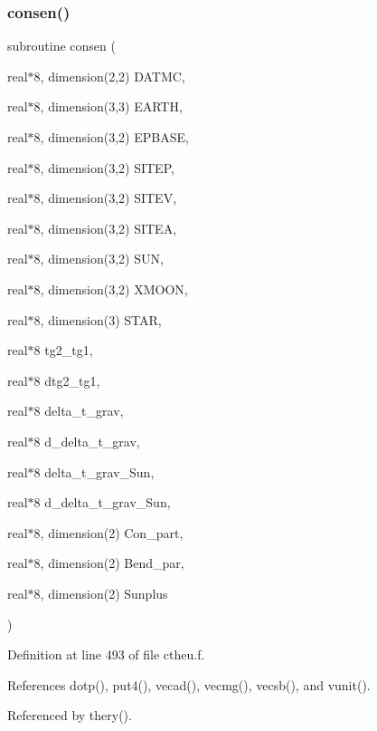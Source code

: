 \subsubsection{\texorpdfstring{consen()}{consen()}}
{\footnotesize\ttfamily subroutine consen (\begin{DoxyParamCaption}\item[{real$\ast$8, dimension(2,2)}]{D\+A\+T\+MC,  }\item[{real$\ast$8, dimension(3,3)}]{E\+A\+R\+TH,  }\item[{real$\ast$8, dimension(3,2)}]{E\+P\+B\+A\+SE,  }\item[{real$\ast$8, dimension(3,2)}]{S\+I\+T\+EP,  }\item[{real$\ast$8, dimension(3,2)}]{S\+I\+T\+EV,  }\item[{real$\ast$8, dimension(3,2)}]{S\+I\+T\+EA,  }\item[{real$\ast$8, dimension(3,2)}]{S\+UN,  }\item[{real$\ast$8, dimension(3,2)}]{X\+M\+O\+ON,  }\item[{real$\ast$8, dimension(3)}]{S\+T\+AR,  }\item[{real$\ast$8}]{tg2\+\_\+tg1,  }\item[{real$\ast$8}]{dtg2\+\_\+tg1,  }\item[{real$\ast$8}]{delta\+\_\+t\+\_\+grav,  }\item[{real$\ast$8}]{d\+\_\+delta\+\_\+t\+\_\+grav,  }\item[{real$\ast$8}]{delta\+\_\+t\+\_\+grav\+\_\+\+Sun,  }\item[{real$\ast$8}]{d\+\_\+delta\+\_\+t\+\_\+grav\+\_\+\+Sun,  }\item[{real$\ast$8, dimension(2)}]{Con\+\_\+part,  }\item[{real$\ast$8, dimension(2)}]{Bend\+\_\+par,  }\item[{real$\ast$8, dimension(2)}]{Sunplus }\end{DoxyParamCaption})}



Definition at line 493 of file ctheu.\+f.



References dotp(), put4(), vecad(), vecmg(), vecsb(), and vunit().



Referenced by thery().

\mbox{\label{ctheu_8f_acf57ec8d03b0b560bf0b8cce7562ef05}} 

